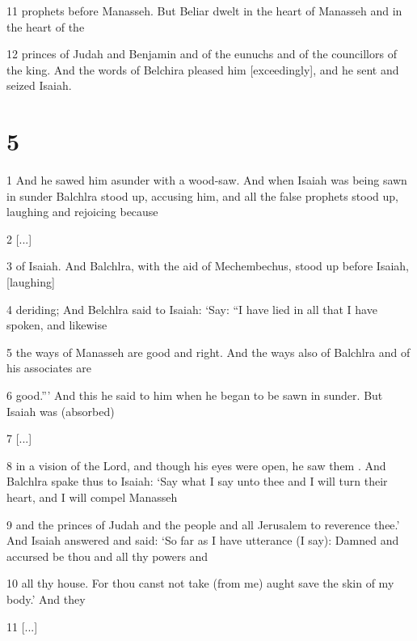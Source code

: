 \par 11 prophets before Manasseh. But Beliar dwelt in the heart of Manasseh and in the heart of the

\par 12 princes of Judah and Benjamin and of the eunuchs and of the councillors of the king. And the words of Belchira pleased him [exceedingly], and he sent and seized Isaiah.

\chapter{5}

\par 1 And he sawed him asunder with a wood-saw. And when Isaiah was being sawn in sunder Balchlra stood up, accusing him, and all the false prophets stood up, laughing and rejoicing because

\par 2 [...]

\par 3 of Isaiah. And Balchlra, with the aid of Mechembechus, stood up before Isaiah, [laughing]

\par 4 deriding; And Belchlra said to Isaiah: ‘Say: “I have lied in all that I have spoken, and likewise

\par 5 the ways of Manasseh are good and right. And the ways also of Balchlra and of his associates are

\par 6 good.”’ And this he said to him when he began to be sawn in sunder. But Isaiah was (absorbed)

\par 7 [...]

\par 8 in a vision of the Lord, and though his eyes were open, he saw them . And Balchlra spake thus to Isaiah: ‘Say what I say unto thee and I will turn their heart, and I will compel Manasseh

\par 9 and the princes of Judah and the people and all Jerusalem to reverence thee.’ And Isaiah answered and said: ‘So far as I have utterance (I say): Damned and accursed be thou and all thy powers and

\par 10 all thy house. For thou canst not take (from me) aught save the skin of my body.’ And they

\par 11 [...]

